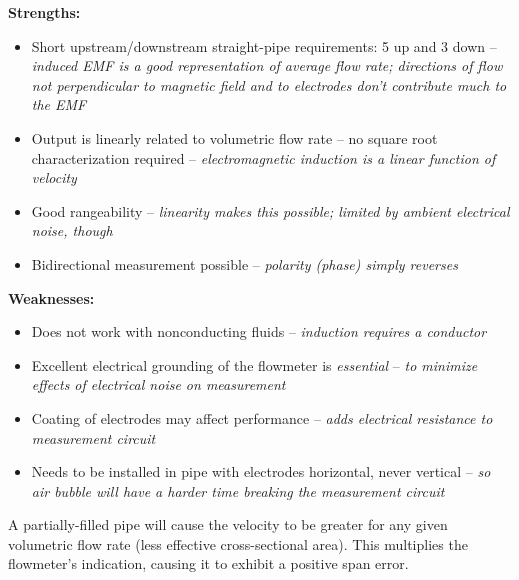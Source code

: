 












{\bf Strengths:}

\begin{itemize}
\item{} Short upstream/downstream straight-pipe requirements: 5 up and 3 down -- {\it induced EMF is a good representation of average flow rate; directions of flow not perpendicular to magnetic field and to electrodes don't contribute much to the EMF}
\item{} Output is linearly related to volumetric flow rate -- no square root characterization required -- {\it electromagnetic induction is a linear function of velocity}
\item{} Good rangeability -- {\it linearity makes this possible; limited by ambient electrical noise, though}
\item{} Bidirectional measurement possible -- {\it polarity (phase) simply reverses}
\end{itemize}

\vskip 10pt

{\bf Weaknesses:}

\begin{itemize}
\item{} Does not work with nonconducting fluids -- {\it induction requires a conductor}
\item{} Excellent electrical grounding of the flowmeter is {\it essential} -- {\it to minimize effects of electrical noise on measurement}
\item{} Coating of electrodes may affect performance -- {\it adds electrical resistance to measurement circuit}
\item{} Needs to be installed in pipe with electrodes horizontal, never vertical -- {\it so air bubble will have a harder time breaking the measurement circuit}
\end{itemize}

\vskip 10pt

A partially-filled pipe will cause the velocity to be greater for any given volumetric flow rate (less effective cross-sectional area).  This multiplies the flowmeter's indication, causing it to exhibit a positive span error.

